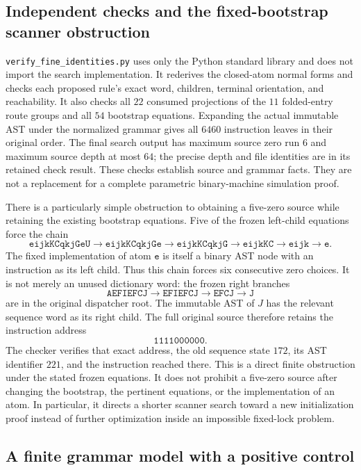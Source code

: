 \subsection{Independent checks and the fixed-bootstrap scanner obstruction}

\texttt{verify\_fine\_identities.py} uses only the Python standard library
and does not import the search implementation. It rederives the closed-atom
normal forms and checks each proposed rule's exact word, children, terminal
orientation, and reachability. It also checks all $22$ consumed projections
of the $11$ folded-entry route groups and all $54$ bootstrap equations.
Expanding the actual immutable AST under the normalized grammar gives all
$6460$ instruction leaves in their original order. The final search output
has maximum source zero run $6$ and maximum source depth at most $64$;
the precise depth and file identities are in its retained check result.
These checks establish source and grammar facts. They are not a replacement
for a complete parametric binary-machine simulation proof.

There is a particularly simple obstruction to obtaining a five-zero source
while retaining the existing bootstrap equations. Five of the frozen
left-child equations force the chain
\[
\mathtt{eijkKCqkjGeU}
\longrightarrow\mathtt{eijkKCqkjGe}
\longrightarrow\mathtt{eijkKCqkjG}
\longrightarrow\mathtt{eijkKC}
\longrightarrow\mathtt{eijk}
\longrightarrow\mathtt{e}.
\]
The fixed implementation of atom $\mathtt e$ is itself a binary AST node
with an instruction as its left child. Thus this chain forces six
consecutive zero choices. It is not merely an unused dictionary word:
the frozen right branches
\[
\mathtt{AEFIEFCJ}\to\mathtt{EFIEFCJ}\to\mathtt{EFCJ}\to\mathtt J
\]
are in the original dispatcher root. The immutable AST of $J$ has the
relevant sequence word as its right child. The full original source
therefore retains the instruction address
\[
 \mathtt{1111000000}.
\]
The checker verifies that exact address, the old sequence state $172$, its
AST identifier $221$, and the instruction reached there. This is a direct
finite obstruction under the stated frozen equations. It does not prohibit
a five-zero source after changing the bootstrap, the pertinent equations,
or the implementation of an atom. In particular, it directs a shorter
scanner search toward a new initialization proof instead of further
optimization inside an impossible fixed-lock problem.

\subsection{A finite grammar model with a positive control}

